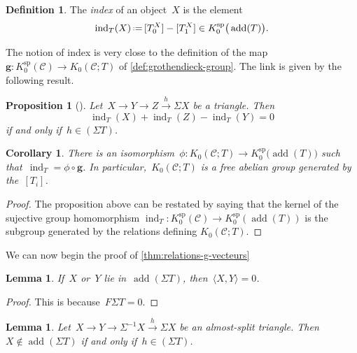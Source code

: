 \documentclass{amsart}
\newtheorem{corollary}[theorem]{Corollary}
\newtheorem{proposition}[theorem]{Proposition}
\newtheorem{lemma}[theorem]{Lemma}
\theoremstyle{definition}
\newtheorem{definition}[theorem]{Definition}
\renewcommand{\b}[1]{{\boldsymbol{#1}}} %
\newcommand{\eqdef}{\mbox{\,\raisebox{0.2ex}{\scriptsize\ensuremath{\mathrm:}}\ensuremath{=}\,}} %
\newcommand{\darkblue}{\color{darkblue}} %
\newcommand{\defn}[1]{\textsl{\darkblue #1}} %
\newcommand{\cat}{\mathcal{C}}
\newcommand{\susp}{\Sigma}
\newcommand{\add}{\operatorname{add}}
\newcommand{\spl}{\operatorname{sp}}
\newcommand{\Ksp}{K_0^{\spl}}
\newcommand{\ind}{\operatorname{ind}}
\begin{document}
\begin{definition}
The \defn{index} of an object~$X$ is the element
\[
\ind_T(X) \eqdef [T_0^X] - [T_1^X] \in \Ksp \big( \add(T) \big).
\]
\end{definition}

The notion of index is very close to the definition of the map~$\b{g}:\Ksp(\cat)\to K_0(\cat ; T)$ of \cref{def:grothendieck-group}. The link is given by the following result.

\begin{proposition}[\cite{Palu}]
Let~$X\xrightarrow{} Y \xrightarrow{} Z \xrightarrow{h} \susp X$ be a triangle.
Then
\[
\ind_T(X) + \ind_T(Z) - \ind_T(Y) = 0
\]
if and only if~$h \in (\susp T)$.
\end{proposition}

\begin{corollary}
\label{coro:grothendieck-g-vectors}
There is an isomorphism~$\phi:K_0(\cat ; T) \to \Ksp \big( \add(T) \big)$ such that~$\ind_T = \phi\circ \b{g}$. In particular,~$K_0(\cat ; T)$ is a free abelian group generated by the~$[T_i]$.
\end{corollary}

\begin{proof}
The proposition above can be restated by saying that the kernel of the sujective group homomorphism $\ind_T: \Ksp(\cat)\to\Ksp(\add(T))$ is the subgroup generated by the relations defining $K_0(\cat ; T)$.
\end{proof}

We can now begin the proof of \cref{thm:relations-g-vecteurs}

\begin{lemma}
\label{lem:bilinear-form-suspention-T}
If~$X$ or~$Y$ lie in~$\add(\susp T)$, then~$\langle X, Y \rangle = 0$.
\end{lemma}

\begin{proof}
This is because~$F\susp T = 0$.
\end{proof}

\begin{lemma}
\label{lem:almost-split}
Let~$X\xrightarrow{} Y \xrightarrow{} \susp^{-1} X \xrightarrow{h} \susp X$ be an almost-split triangle. Then~$X\notin \add(\susp T)$ if and only if~$h \in (\susp T)$.
\end{lemma}
\end{document}
